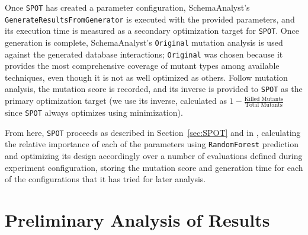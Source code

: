 \documentclass[a4paper,twocolumn]{article}
\begin{document}
Once \texttt{SPOT} has created a parameter configuration, SchemaAnalyst's \texttt{GenerateResultsFromGenerator} is executed with the provided parameters, and its execution time is measured as a secondary optimization target for \texttt{SPOT}. Once generation is complete, SchemaAnalyst's \texttt{Original} mutation analysis is used against the generated database interactions; \texttt{Original} was chosen because it provides the most comprehensive coverage of mutant types among available techniques, even though it is not as well optimized as others. Follow mutation analysis, the mutation score is recorded, and its inverse is provided to \texttt{SPOT} as the primary optimization target (we use its inverse, calculated as $1 - \frac{\text{Killed Mutants}}{\text{Total Mutants}}$ since \texttt{SPOT} always optimizes using minimization).

From here, \texttt{SPOT} proceeds as described in Section~\ref{sec:SPOT} and in \cite{SPOT2005}, calculating the relative importance of each of the parameters using \texttt{RandomForest} prediction and optimizing its design accordingly over a number of evaluations defined during experiment configuration, storing the mutation score and generation time for each of the configurations that it has tried for later analysis.

\section{Preliminary Analysis of Results}






\end{document}
